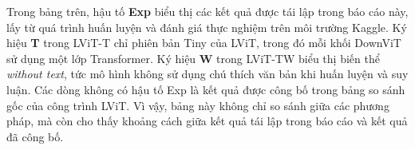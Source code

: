 \begin{table}[H]
    \centering
    \caption{Kết quả so sánh LViT thử nghiệm với LViT công bố và các phương pháp SOTA}
\end{table}

Trong bảng trên, hậu tố \textbf{Exp} biểu thị các kết quả được tái lập trong báo cáo này, lấy từ quá trình huấn luyện và đánh giá thực nghiệm trên môi trường Kaggle. Ký hiệu \textbf{T} trong LViT-T chỉ phiên bản Tiny của LViT, trong đó mỗi khối DownViT sử dụng một lớp Transformer. Ký hiệu \textbf{W} trong LViT-TW biểu thị biến thể \textit{without text}, tức mô hình không sử dụng chú thích văn bản khi huấn luyện và suy luận. Các dòng không có hậu tố Exp là kết quả được công bố trong bảng so sánh gốc của công trình LViT. Vì vậy, bảng này không chỉ so sánh giữa các phương pháp, mà còn cho thấy khoảng cách giữa kết quả tái lập trong báo cáo và kết quả đã công bố.

